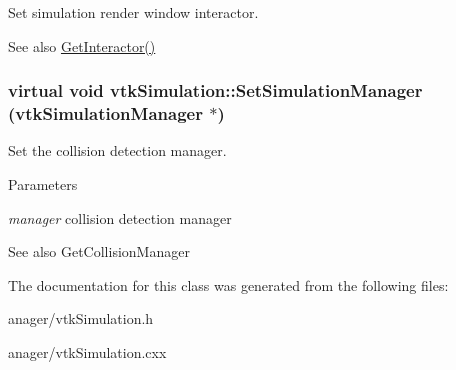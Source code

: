 Set simulation render window interactor. 

\begin{DoxySeeAlso}{See also}
\hyperlink{classvtkSimulation_a80ce57f6226a646fd8faf2fac1767a64}{GetInteractor()} 
\end{DoxySeeAlso}
\hypertarget{classvtkSimulation_a244662f687e733e277feaf5c7dcdae6c}{
\subsubsection[{SetSimulationManager}]{\setlength{\rightskip}{0pt plus 5cm}virtual void vtkSimulation::SetSimulationManager ({\bf vtkSimulationManager} $\ast$)}}
\label{classvtkSimulation_a244662f687e733e277feaf5c7dcdae6c}


Set the collision detection manager. 


\begin{DoxyParams}{Parameters}
\item[{\em manager}]collision detection manager \end{DoxyParams}
\begin{DoxySeeAlso}{See also}
GetCollisionManager 
\end{DoxySeeAlso}


The documentation for this class was generated from the following files:\begin{DoxyCompactItemize}
\item 
anager/vtkSimulation.h\item 
anager/vtkSimulation.cxx\end{DoxyCompactItemize}
